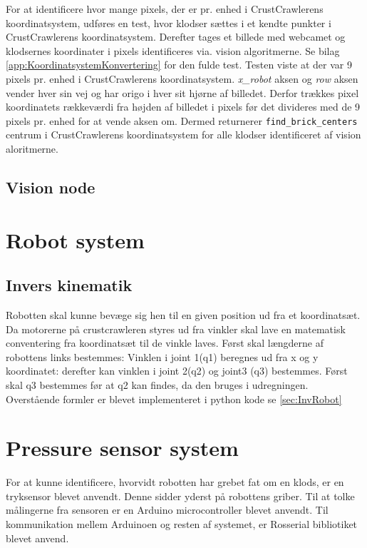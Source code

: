 
For at identificere hvor mange pixels, der er pr. enhed i CrustCrawlerens koordinatsystem, udføres en test, hvor klodser sættes i et kendte punkter i CrustCrawlerens koordinatsystem.
Derefter tages et billede med webcamet og klodsernes koordinater i pixels identificeres via. vision algoritmerne.
Se bilag \vref{app:KoordinatsystemKonvertering} for den fulde test.
Testen viste at der var 9 pixels pr. enhed i CrustCrawlerens koordinatsystem.
\textit{x\_robot} aksen og \textit{row} aksen vender hver sin vej og har origo i hver sit hjørne af billedet.
Derfor trækkes pixel koordinatets rækkeværdi fra højden af billedet i pixels før det divideres med de 9 pixels pr. enhed for at vende aksen om.
Dermed returnerer \texttt{find\_brick\_centers} centrum i CrustCrawlerens koordinatsystem for alle klodser identificeret af vision aloritmerne.

\subsection{Vision node}

\section{Robot system}
\subsection{Invers kinematik}
Robotten skal kunne bevæge sig hen til en given position ud fra et koordinatsæt. Da motorerne på crustcrawleren styres ud fra vinkler skal lave
en matematisk conventering fra koordinatsæt til de vinkle laves.\newline
Først skal længderne af robottens links bestemmes:
Vinklen i joint 1(q1) beregnes ud fra x og y koordinatet:
derefter kan vinklen i joint 2(q2) og joint3 (q3) bestemmes. Først skal q3 bestemmes før at q2 kan findes, da den bruges i udregningen.
Overstående formler er blevet implementeret i python kode se \vref{sec:InvRobot}


\section{Pressure sensor system}
For at kunne identificere, hvorvidt robotten har grebet fat om en klods, er en tryksensor blevet anvendt. Denne sidder yderst på robottens griber. Til at tolke målingerne fra sensoren er en Arduino microcontroller blevet anvendt. Til kommunikation mellem Arduinoen og resten af systemet, er Rosserial bibliotiket blevet anvend. 

